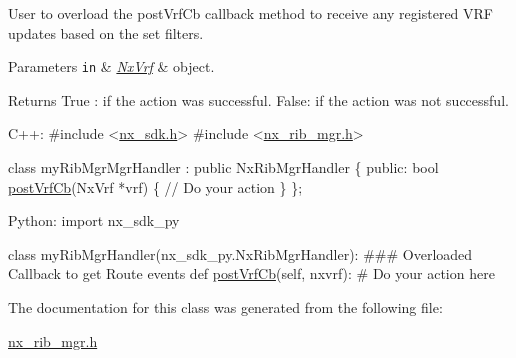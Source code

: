 User to overload the post\+Vrf\+Cb callback method to receive any registered V\+RF updates based on the set filters. 
\begin{DoxyParams}[1]{Parameters}
\mbox{\tt in}  & {\em \mbox{\hyperlink{classnxos_1_1_nx_vrf}{Nx\+Vrf}}} & object.\\
\hline
\end{DoxyParams}
\begin{DoxyReturn}{Returns}
True \+: if the action was successful. False\+: if the action was not successful.
\end{DoxyReturn}

\begin{DoxyCode}
C++:
\textcolor{preprocessor}{   #include <\mbox{\hyperlink{nx__sdk_8h}{nx\_sdk.h}}>}
\textcolor{preprocessor}{   #include <\mbox{\hyperlink{nx__rib__mgr_8h}{nx\_rib\_mgr.h}}>}

   \textcolor{keyword}{class }myRibMgrMgrHandler : \textcolor{keyword}{public} NxRibMgrHandler \{
      \textcolor{keyword}{public}:
         \textcolor{keywordtype}{bool} \mbox{\hyperlink{classnxos_1_1_nx_rib_mgr_handler_a2ed5a3ad9c0e55d21e18d88a19419a5e}{postVrfCb}}(NxVrf *vrf) \{
              \textcolor{comment}{// Do your action}
         \}
   \};

Python:
   \textcolor{keyword}{import} nx\_sdk\_py

   \textcolor{keyword}{class }myRibMgrHandler(nx\_sdk\_py.NxRibMgrHandler):
\textcolor{preprocessor}{   ### Overloaded Callback to get Route events}
         def \mbox{\hyperlink{classnxos_1_1_nx_rib_mgr_handler_a2ed5a3ad9c0e55d21e18d88a19419a5e}{postVrfCb}}(self, nxvrf):
\textcolor{preprocessor}{             # Do your action here}
\end{DoxyCode}
 

The documentation for this class was generated from the following file\+:\begin{DoxyCompactItemize}
\item 
\mbox{\hyperlink{nx__rib__mgr_8h}{nx\+\_\+rib\+\_\+mgr.\+h}}\end{DoxyCompactItemize}
